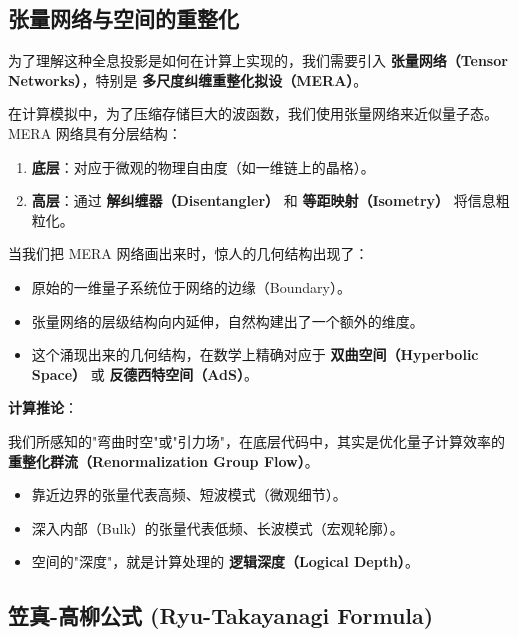 \subsection{张量网络与空间的重整化}

为了理解这种全息投影是如何在计算上实现的，我们需要引入 \textbf{张量网络（Tensor Networks）}，特别是 \textbf{多尺度纠缠重整化拟设（MERA）}。

在计算模拟中，为了压缩存储巨大的波函数，我们使用张量网络来近似量子态。MERA 网络具有分层结构：

\begin{enumerate}
\item \textbf{底层}：对应于微观的物理自由度（如一维链上的晶格）。

\item \textbf{高层}：通过 \textbf{解纠缠器（Disentangler）} 和 \textbf{等距映射（Isometry）} 将信息粗粒化。
\end{enumerate}

当我们把 MERA 网络画出来时，惊人的几何结构出现了：

\begin{itemize}
\item 原始的一维量子系统位于网络的边缘（Boundary）。

\item 张量网络的层级结构向内延伸，自然构建出了一个额外的维度。

\item 这个涌现出来的几何结构，在数学上精确对应于 \textbf{双曲空间（Hyperbolic Space）} 或 \textbf{反德西特空间（AdS）}。
\end{itemize}

\textbf{计算推论}：

我们所感知的"弯曲时空"或"引力场"，在底层代码中，其实是优化量子计算效率的 \textbf{重整化群流（Renormalization Group Flow）}。

\begin{itemize}
\item 靠近边界的张量代表高频、短波模式（微观细节）。

\item 深入内部（Bulk）的张量代表低频、长波模式（宏观轮廓）。

\item 空间的"深度"，就是计算处理的 \textbf{逻辑深度（Logical Depth）}。
\end{itemize}

\subsection{笠真-高柳公式 (Ryu-Takayanagi Formula)}


